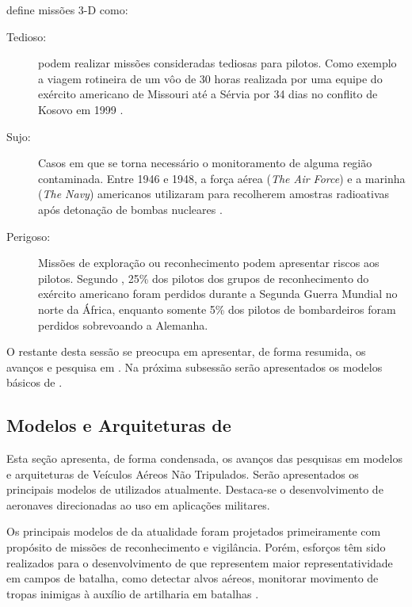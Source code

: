 \cite{uav_roadmap2005} define missões 3-D como:
\begin{description}
\item[Tedioso: ]
\vants podem realizar missões consideradas tediosas para pilotos. Como exemplo a viagem rotineira de um vôo de 30 horas realizada por uma equipe do exército americano de Missouri até a Sérvia por 34 dias no conflito de Kosovo em 1999 \cite{uav_roadmap2005}. 

\item[Sujo: ]
Casos em que se torna necessário o monitoramento de alguma região contaminada. Entre 1946 e 1948, a força aérea (\emph{The Air Force}) e a marinha (\emph{The Navy}) americanos utilizaram \vants para recolherem amostras radioativas após detonação de bombas nucleares \cite{uav_roadmap2005}.

\item[Perigoso: ]
Missões de exploração ou reconhecimento podem apresentar riscos aos pilotos. Segundo \cite{uav_roadmap2005}, 25\%  dos pilotos dos grupos de reconhecimento do exército americano foram perdidos durante a Segunda Guerra Mundial no norte da África, enquanto somente 5\% dos pilotos de bombardeiros foram perdidos sobrevoando a Alemanha.

\end{description}

O restante desta sessão se preocupa em apresentar, de forma resumida, os avanços e pesquisa em \uavs. Na próxima subsessão serão apresentados os modelos básicos de \vants.

\subsection{Modelos e Arquiteturas de \vants}

Esta seção apresenta, de forma condensada, os avanços das pesquisas em modelos e arquiteturas de Veículos Aéreos Não Tripulados. Serão apresentados os principais modelos de \vants utilizados atualmente. Destaca-se o desenvolvimento de aeronaves direcionadas ao uso em aplicações militares.

Os principais modelos de \vants da atualidade foram projetados primeiramente com propósito de missões de reconhecimento e vigilância. Porém, esforços têm sido realizados para o desenvolvimento de \vants que representem maior representatividade em campos de batalha, como detectar alvos aéreos, monitorar movimento de tropas inimigas à auxílio de artilharia em batalhas \cite{Bone2003}.

